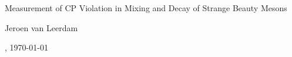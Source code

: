 \thispagestyle{empty}
\begin{center}

  \huge
  Measurement of CP Violation in Mixing and Decay of Strange Beauty Mesons\\


  \Large
  Jeroen van Leerdam


  \normalsize
  \currenttime, \today

\end{center}

\newpage
\thispagestyle{empty}
